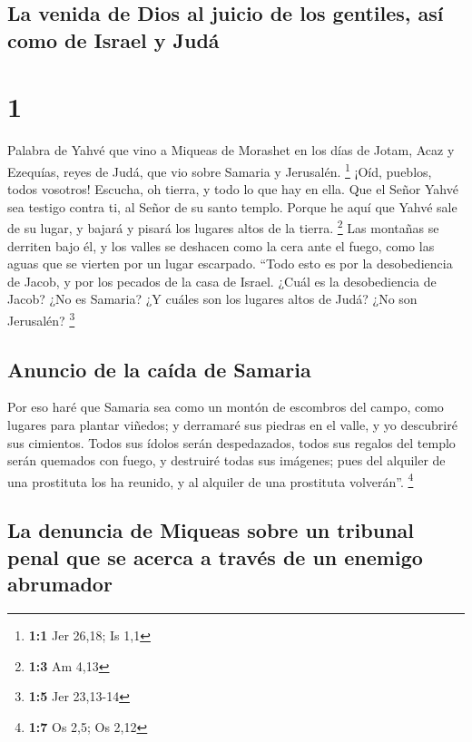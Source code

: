 \hypertarget{la-venida-de-dios-al-juicio-de-los-gentiles-asuxed-como-de-israel-y-juduxe1}{%
\subsection{La venida de Dios al juicio de los gentiles, así como de
Israel y
Judá}\label{la-venida-de-dios-al-juicio-de-los-gentiles-asuxed-como-de-israel-y-juduxe1}}

\hypertarget{section}{%
\section{1}\label{section}}

 Palabra de Yahvé que vino a Miqueas de Morashet en los
días de Jotam, Acaz y Ezequías, reyes de Judá, que vio sobre Samaria y
Jerusalén. \footnote{\textbf{1:1} Jer 26,18; Is 1,1} 
¡Oíd, pueblos, todos vosotros! Escucha, oh tierra, y todo lo que hay en
ella. Que el Señor Yahvé sea testigo contra ti, al Señor de su santo
templo.  Porque he aquí que Yahvé sale de su lugar, y
bajará y pisará los lugares altos de la tierra. \footnote{\textbf{1:3}
  Am 4,13}  Las montañas se derriten bajo él, y los valles
se deshacen como la cera ante el fuego, como las aguas que se vierten
por un lugar escarpado.  ``Todo esto es por la
desobediencia de Jacob, y por los pecados de la casa de Israel. ¿Cuál es
la desobediencia de Jacob? ¿No es Samaria? ¿Y cuáles son los lugares
altos de Judá? ¿No son Jerusalén? \footnote{\textbf{1:5} Jer 23,13-14}

\hypertarget{anuncio-de-la-cauxedda-de-samaria}{%
\subsection{Anuncio de la caída de
Samaria}\label{anuncio-de-la-cauxedda-de-samaria}}

 Por eso haré que Samaria sea como un montón de escombros
del campo, como lugares para plantar viñedos; y derramaré sus piedras en
el valle, y yo descubriré sus cimientos.  Todos sus ídolos
serán despedazados, todos sus regalos del templo serán quemados con
fuego, y destruiré todas sus imágenes; pues del alquiler de una
prostituta los ha reunido, y al alquiler de una prostituta volverán''.
\footnote{\textbf{1:7} Os 2,5; Os 2,12}

\hypertarget{la-denuncia-de-miqueas-sobre-un-tribunal-penal-que-se-acerca-a-travuxe9s-de-un-enemigo-abrumador}{%
\subsection{La denuncia de Miqueas sobre un tribunal penal que se acerca
a través de un enemigo
abrumador}\label{la-denuncia-de-miqueas-sobre-un-tribunal-penal-que-se-acerca-a-travuxe9s-de-un-enemigo-abrumador}}

